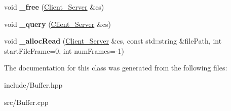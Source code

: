 \begin{DoxyCompactItemize}
\item 
\hypertarget{classColliderPlusPlus_1_1Buffer_a9c778cdbd7058e35149a3f40dc5ab835}{void {\bfseries \-\_\-free} (\hyperlink{classColliderPlusPlus_1_1Client__Server}{Client\-\_\-\-Server} \&cs)}\label{classColliderPlusPlus_1_1Buffer_a9c778cdbd7058e35149a3f40dc5ab835}

\item 
\hypertarget{classColliderPlusPlus_1_1Buffer_a2bab98cd804cda15d3fc1128cb6bfbb4}{void {\bfseries \-\_\-query} (\hyperlink{classColliderPlusPlus_1_1Client__Server}{Client\-\_\-\-Server} \&cs)}\label{classColliderPlusPlus_1_1Buffer_a2bab98cd804cda15d3fc1128cb6bfbb4}

\item 
\hypertarget{classColliderPlusPlus_1_1Buffer_a1b583c7909290f0e28bd973a4ce3d4f2}{void {\bfseries \-\_\-alloc\-Read} (\hyperlink{classColliderPlusPlus_1_1Client__Server}{Client\-\_\-\-Server} \&cs, const std\-::string \&file\-Path, int start\-File\-Frame=0, int num\-Frames=-\/1)}\label{classColliderPlusPlus_1_1Buffer_a1b583c7909290f0e28bd973a4ce3d4f2}

\end{DoxyCompactItemize}


The documentation for this class was generated from the following files\-:\begin{DoxyCompactItemize}
\item 
include/Buffer.\-hpp\item 
src/Buffer.\-cpp\end{DoxyCompactItemize}
